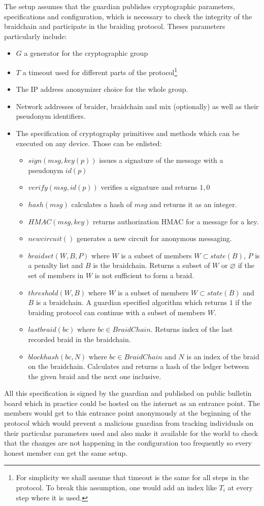 \documentclass[12pt]{article}
\begin{document}
The setup assumes that the guardian publishes cryptographic parameters, specifications and configuration, which is necessary to check the integrity of the braidchain and participate in the braiding protocol. Theses parameters particularly include:
\begin{itemize}
\item $G$ a generator for the cryptographic group
\item $T$ a timeout used for different parts of the protocol\footnote{For simplicity we shall assume that timeout is the same for all steps in the protocol. To break this assumption, one would add an index like $T_i$ at every step where it is used.}
\item The IP address anonymizer choice for the whole group.
\item Network addresses of braider, braidchain and mix (optionally) as well as their pseudonym identifiers.
\item The specification of cryptography primitives and methods which can be executed on any device. Those can be enlisted:
  \begin{itemize}
  \item $sign(msg, key(p))$ issues a signature of the message with a pseudonym $id(p)$
  \item $verify(msg, id(p))$ verifies a signature and returns ${1, 0}$ 
  \item $hash(msg)$ calculates a hash of $msg$ and returns it as an integer.
  \item $HMAC(msg, key)$ returns authorization HMAC for a message for a key.
  \item $newcircuit()$ generates a new circuit for anonymous messaging.
  \item $braidset(W, B, P)$ where $W$ is a subset of members $W \subset state(B)$, $P$ is a penalty list and $B$ is the braidchain. Returns a subset of $W$ or $\varnothing$ if the set of members in $W$ is not sufficient to form a braid.
  \item $threshold(W, B)$ where $W$ is a subset of members $W \subset state(B)$ and $B$ is a braidchain. A guardian specified algorithm which returns $1$ if the braiding protocol can continue with a subset of members $W$.
  \item $lastbraid(bc)$ where $bc \in BraidChain$. Returns index of the last recorded braid in the braidchain.
  \item $blockhash(bc, N)$ where $bc \in BraidChain$ and $N$ is an index of the braid on the braidchain. Calculates and returns a hash of the ledger between the given braid and the next one inclusive.
  \end{itemize}
\end{itemize}
All this specification is signed by the guardian and published on public bulletin board which in practice could be hosted on the internet as an entrance point. The members would get to this entrance point anonymously at the beginning of the protocol which would prevent a malicious guardian from tracking individuals on their particular parameters used and also make it available for the world to check that the changes are not happening in the configuration too frequently so every honest member can get the same setup.
\end{document}
